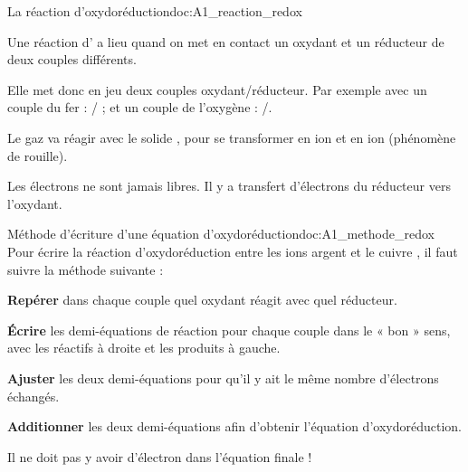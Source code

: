 \begin{doc}{La réaction d'oxydoréduction}{doc:A1_reaction_redox}
  \begin{encart}
    Une réaction d' a lieu quand on met en contact un oxydant et un réducteur de deux couples différents.
  \end{encart}
  
  Elle met donc en jeu deux couples oxydant/réducteur.
  Par exemple avec un couple du fer : / ; et un couple de l'oxygène : /.

  Le gaz  va réagir avec le solide , pour se transformer en ion  et en ion  (phénomène de rouille).

  \begin{encart}
    Les électrons ne sont jamais libres.
    Il y a transfert d'électrons du réducteur vers l'oxydant.
  \end{encart}
\end{doc}


\begin{doc}{Méthode d'écriture d'une équation d'oxydoréduction}{doc:A1_methode_redox}
  Pour écrire la réaction d'oxydoréduction entre les ions argent  et le cuivre , il faut suivre la méthode suivante :
  \begin{enumeration}
    \item \textbf{Repérer} dans chaque couple quel oxydant réagit avec quel réducteur.
    \item \textbf{Écrire} les demi-équations de réaction pour chaque couple dans le « bon » sens, avec les réactifs à droite et les produits à gauche.
    \item \textbf{Ajuster} les deux demi-équations pour qu'il y ait le même nombre d'électrons échangés.
    \item \textbf{Additionner} les deux demi-équations afin d'obtenir l'équation d'oxydoréduction.
  \end{enumeration}
  \attention Il ne doit pas y avoir d'électron dans l'équation finale !
\end{doc}

